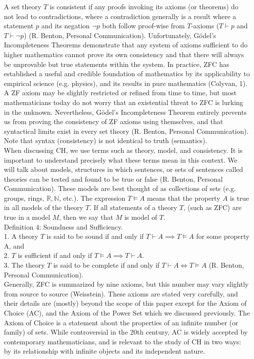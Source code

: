 \documentclass[10pt,letterpaper]{amsart}
\numberwithin{equation}{section}
\theoremstyle{plain}
\theoremstyle{definition}
\numberwithin{equation}{section}
\begin{document}
A set theory $T$ is consistent if any proofs invoking its axioms (or theorems) do not lead to contradictions, where a contradiction generally is a result where a statement $p$ and its negation $\neg p$ both follow proof-wise from $T$-axioms ($T\vdash p$ and $T\vdash \neg p$) (R. Benton, Personal Communication). Unfortunately, Gödel's Incompleteness Theorems demonstrate that any system of axioms sufficient to do higher mathematics cannot prove its own consistency and that there will always be unprovable but true statements within the system. In practice, ZFC has established a useful and credible foundation of mathematics by its applicability to empirical science (e.g. physics), and its results in pure mathematics (Colyvan, 1). A ZF axiom may be slightly restricted or refined from time to time, but most mathematicians today do not worry that an existential threat to ZFC is lurking in the unknown. Nevertheless, Gödel's Incompleteness Theorem entirely prevents us from proving the consistency of ZF axioms using themselves, and that syntactical limits exist in every set theory (R. Benton, Personal Communication). Note that syntax (consistency) is not identical to truth (semantics).\\

When discussing CH, we use terms such as theory, model, and consistency. It is important to understand precisely what these terms mean in this context. We will talk about models, structures in which sentences, or sets of sentences called theories can be tested and found to be true or false (R. Benton, Personal Communication). These models are best thought of as collections of sets (e.g. groups, rings, $\mathbb{R}, \mathbb{N}$, etc.). The expression $T\models A$ means that the property $A$ is true in all models of the theory $T$. If all statements of a theory $T$, (such as ZFC) are true in a model $M$, then we say that $M$ is model of $T$.  \\

\noindent Definition 4: Soundness and Sufficiency. \\
1. A theory $T$ is said to be sound if and only if $T\vdash A \implies T\models A$ for some property A, and \\
2. $T$ is sufficient if and only if $T\models A \implies T\vdash A$. \\
3. The theory $T$ is said to be complete if and only if $T\vdash A \iff T\models A$ (R. Benton, Personal Communication). \\

Generally, ZFC is summarized by nine axioms, but this number may vary slightly from source to source (Weisstein). These axioms are stated very carefully, and their details are (mostly) beyond the scope of this paper except for the Axiom of Choice (AC), and the Axiom of the Power Set which we discussed previously. The Axiom of Choice is a statement about the properties of an infinite number (or family) of sets. While controversial in the 20th century, AC is widely accepted by contemporary mathematicians, and is relevant to the study of CH in two ways: by its relationship with infinite objects and its independent nature. \\
\end{document}
